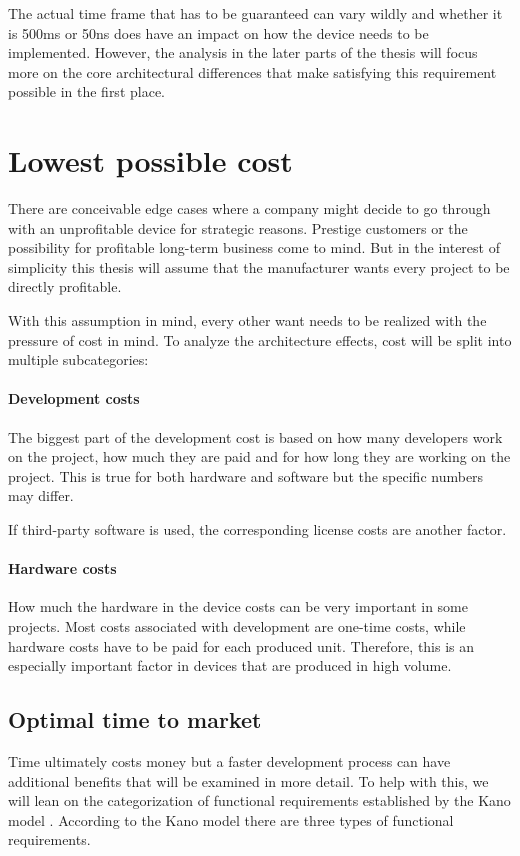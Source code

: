 The actual time frame that has to be guaranteed can vary wildly and whether it is 500ms or 50ns does have an impact on how the device needs to be implemented. However, the analysis in the later parts of the thesis will focus more on the core architectural differences that make satisfying this requirement possible in the first place. 

\section{Lowest possible cost}
There are conceivable edge cases where a company might decide to go through with an unprofitable device for strategic reasons. Prestige customers or the possibility for profitable long-term business come to  mind. But in the interest of simplicity this thesis will assume that the manufacturer wants every project to be directly profitable.

With this assumption in mind, every other want needs to be realized with the pressure of cost in mind. To analyze the architecture effects, cost will be split into multiple subcategories:
\paragraph{Development costs}
The biggest part of the development cost is based on how many developers work on the project, how  much they are paid and for how long they are working on the project. This is true for both hardware and software but the specific numbers may differ. 

If third-party software is used, the corresponding license costs are another factor. 
\paragraph{Hardware costs}
How much the hardware in the device costs can be very important in some projects. Most costs associated with development are one-time costs, while hardware costs have to be paid for each produced unit. Therefore, this is an especially important factor in devices that are produced in high volume.

\subsection{Optimal time to market \label{optimal-ttm}}
Time ultimately costs money but a faster development process can have additional benefits that will be examined in more detail. To help with this, we will lean on the categorization of functional requirements established by the Kano model \cite{KanoNoriaki.1984}\cite{ElmarSauerwein.1996}. According to the Kano model there are three types of functional requirements.
